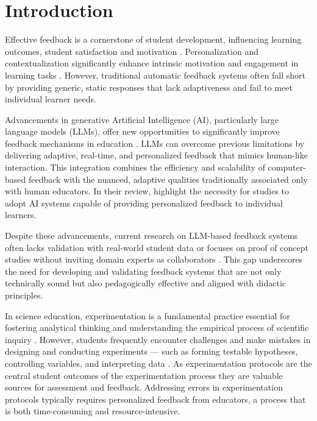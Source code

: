 \section{Introduction}

Effective feedback is a cornerstone of student development, influencing learning outcomes, student satisfaction and motivation \citep{gan2021teacher,wisniewski2020power,monteiro2021creating}. Personalization and contextualization significantly enhance intrinsic motivation and engagement in learning tasks \citep{cordova1996intrinsic}. However, traditional automatic feedback systems often fall short by providing generic, static responses that lack adaptiveness and fail to meet individual learner needs.

Advancements in generative Artificial Intelligence (AI), particularly large language models (LLMs), offer new opportunities to significantly improve feedback mechanisms in education \citep{kasneci2023chatgpt}. LLMs can overcome previous limitations by delivering adaptive, real-time, and personalized feedback that mimics human-like interaction. This integration combines the efficiency and scalability of computer-based feedback with the nuanced, adaptive qualities traditionally associated only with human educators. In their review, \citet{maier2022personalized} highlight the necessity for studies to adopt AI systems capable of providing personalized feedback to individual learners.

Despite these advancements, current research on LLM-based feedback systems often lacks validation with real-world student data or focuses on proof of concept studies without inviting domain experts as collaborators \citep{nguyen2023evaluating,sessler2023peer,gabbay2024combining}. This gap underscores the need for developing and validating feedback systems that are not only technically sound but also pedagogically effective and aligned with didactic principles.

In science education, experimentation is a fundamental practice essential for fostering analytical thinking and understanding the empirical process of scientific inquiry \citep{NationalResearchCouncil2012}. 
However, students frequently encounter challenges and make mistakes in designing and conducting experiments — such as forming testable hypotheses, controlling variables, and interpreting data \citep{kranz2023learners, baur2018fehler}. As experimentation protocols are the central student outcomes of the experimentation process they are valuable sources for assessment and feedback. Addressing errors in experimentation protocols typically requires personalized feedback from educators, a process that is both time-consuming and resource-intensive.

